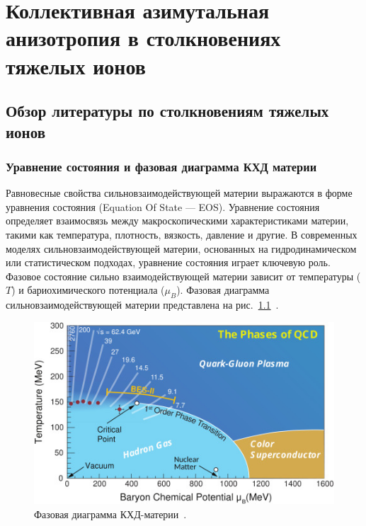\chapter{Коллективная азимутальная анизотропия в столкновениях тяжелых ионов} \label{chapt1}

\section{Обзор литературы по столкновениям тяжелых ионов}

\subsection{Уравнение состояния и фазовая диаграмма КХД материи}

Равновесные свойства сильновзаимодействующей материи выражаются в форме уравнения состояния (Equation Of State — EOS). 
Уравнение состояния определяет взаимосвязь между макроскопическими характеристиками материи, такими как температура, плотность, вязкость, давление и другие.
В современных моделях сильновзаимодействующей материи, основанных на гидродинамическом или статистическом подходах, уравнение состояния играет ключевую роль.
Фазовое состояние сильно взаимодействующей материи зависит от температуры ($T$) и бариохимического потенциала ($\mu_B$).
Фазовая диаграмма сильновзаимодействующей материи представлена на рис.~\ref{fig:qcd_phase_diagram}~\cite{Bzdak:2019pkr}.
%
\begin{figure}[h]
    \centering
    \includegraphics[width=0.5\linewidth]{images/1-s2.0-S0370157320300156-gr1.jpg}
    \caption{Фазовая диаграмма КХД-материи~\cite{Bzdak:2019pkr}.}
    \label{fig:qcd_phase_diagram}
\end{figure}

